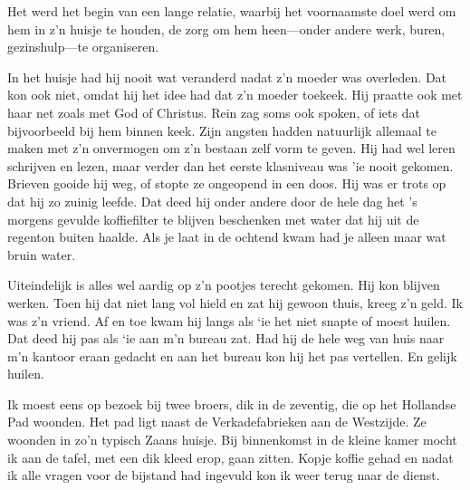 \documentclass[10pt,twoside, openright]{memoir}
\begin{document}
Het werd het begin van een lange relatie, waarbij het voornaamste doel werd om hem in z’n huisje te houden, de zorg om hem heen---onder andere werk, buren, gezinshulp---te organiseren. 

In het huisje had hij nooit wat veranderd nadat z’n moeder was overleden. Dat kon ook niet, omdat hij het idee had dat z’n moeder toekeek. Hij praatte ook met haar net zoals met God of Christus. Rein zag soms ook spoken, of iets dat bijvoorbeeld bij hem binnen keek. Zijn angsten hadden natuurlijk allemaal te maken met z’n onvermogen om z’n bestaan zelf vorm te geven. Hij had wel leren schrijven en lezen, maar verder dan het eerste klasniveau was 'ie nooit gekomen. Brieven gooide hij weg, of stopte ze ongeopend in een doos. Hij was er trots op dat hij zo zuinig leefde. Dat deed hij onder andere door de hele dag het ’s morgens gevulde koffiefilter te blijven beschenken met water dat hij uit de regenton buiten haalde. Als je laat in de ochtend kwam had je alleen maar wat bruin water. 

Uiteindelijk is alles wel aardig op z’n pootjes terecht gekomen. Hij kon blijven werken. Toen hij dat niet lang vol hield en zat hij gewoon thuis, kreeg z’n geld. Ik was z’n vriend. Af en toe kwam hij langs als `ie het niet snapte of moest huilen. Dat deed hij pas als `ie aan m’n bureau zat. Had hij de hele weg van huis naar m’n kantoor eraan gedacht en aan het bureau kon hij het pas vertellen. En gelijk huilen.

Ik moest eens op bezoek bij twee broers, dik in de zeventig, die op het Hollandse Pad woonden. Het pad ligt naast de Verkadefabrieken aan de Westzijde. Ze woonden in zo’n typisch Zaans huisje. Bij binnenkomst in de kleine kamer mocht ik aan de tafel, met een dik kleed erop, gaan zitten. Kopje koffie gehad en nadat ik alle vragen voor de bijstand had ingevuld kon ik weer terug naar de dienst. 
\end{document}
